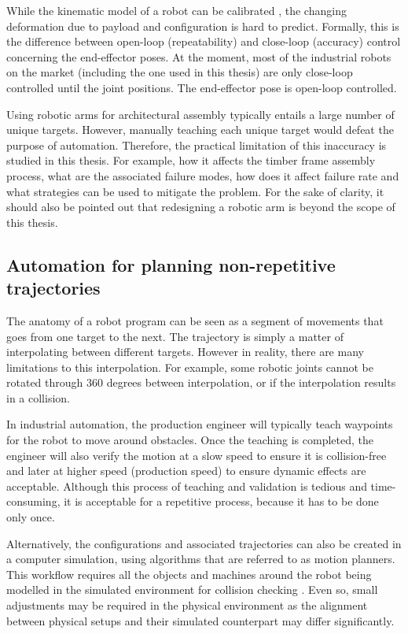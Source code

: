 While the kinematic model of a robot can be calibrated \parencite{mooringFundamentalsManipulatorCalibration1991}, the changing deformation due to payload and configuration is hard to predict. Formally, this is the difference between open-loop (repeatability) and close-loop (accuracy) control concerning the end-effector poses. At the moment, most of the industrial robots on the market (including the one used in this thesis) are only close-loop controlled until the joint positions. The end-effector pose is open-loop controlled.  

Using robotic arms for architectural assembly typically entails a large number of unique targets. However, manually teaching each unique target would defeat the purpose of automation. Therefore, the practical limitation of this inaccuracy is studied in this thesis. For example, how it affects the timber frame assembly process, what are the associated failure modes, how does it affect failure rate and what strategies can be used to mitigate the problem. For the sake of clarity, it should also be pointed out that redesigning a robotic arm is beyond the scope of this thesis.

\subsection{Automation for planning non-repetitive trajectories}
\label{subsection:introduction-automation-for-planning-non-repetitive-trajectories}

The anatomy of a robot program can be seen as a segment of movements that goes from one target to the next. The trajectory is simply a matter of interpolating between different targets. However in reality, there are many limitations to this interpolation. For example, some robotic joints cannot be rotated through 360 degrees between interpolation, or if the interpolation results in a collision.

In industrial automation, the production engineer will typically teach waypoints for the robot to move around obstacles. Once the teaching is completed, the engineer will also verify the motion at a slow speed to ensure it is collision-free and later at higher speed (production speed) to ensure dynamic effects are acceptable. Although this process of teaching and validation is tedious and time-consuming, it is acceptable for a repetitive process, because it has to be done only once. 

Alternatively, the configurations and associated trajectories can also be created in a computer simulation, using algorithms that are referred to as motion planners\parencite{lavallePlanningAlgorithms2006}. This workflow requires all the objects and machines around the robot being modelled in the simulated environment for collision checking . Even so, small adjustments may be required in the physical environment as the alignment between physical setups and their simulated counterpart may differ significantly.

